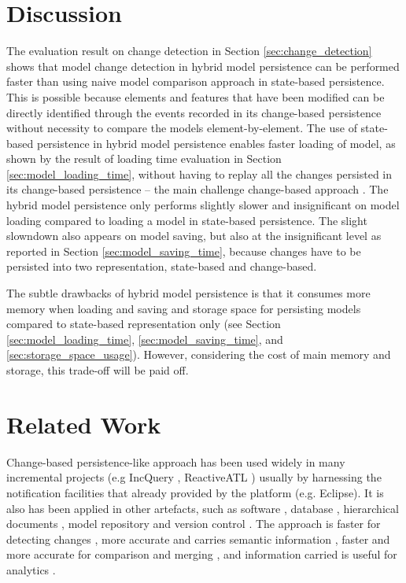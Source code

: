 \documentclass[10pt,conference]{IEEEtran}
\begin{document}
\section{Discussion}
\label{sec:discussion}
The evaluation result on change detection in Section \ref{sec:change_detection} shows that model change detection in hybrid model persistence can be performed faster than using naive model comparison approach in state-based persistence. This is possible because elements and features that have been modified can be directly identified through the events recorded in its change-based persistence without necessity to compare the models element-by-element. The use of state-based persistence in hybrid model persistence enables faster loading of model, as shown by the result of loading time evaluation in Section \ref{sec:model_loading_time}, without having to replay all the changes persisted in its change-based persistence -- the main challenge change-based approach \cite{mens2002state}. 
The hybrid model persistence only performs slightly slower and insignificant on model loading compared to loading a model in state-based persistence. The slight slowndown also appears on model saving, but also at the insignificant level as reported in Section \ref{sec:model_saving_time}, because changes have to be persisted into two representation, state-based and change-based. 

The subtle drawbacks of hybrid model persistence is that it consumes more memory when loading and saving and storage space for persisting models compared to state-based representation only (see Section \ref{sec:model_loading_time}, \ref{sec:model_saving_time}, and \ref{sec:storage_space_usage}). However, considering the cost of main memory and storage, this trade-off will be paid off.

\section{Related Work}
\label{sec:related_work}
Change-based persistence-like approach has been used widely in many incremental projects (e.g IncQuery \cite{DBLP:conf/ecmdafa/RathHV12}, ReactiveATL \cite{DBLP:conf/ecmdafa/OgunyomiRK15}) usually by harnessing the notification facilities that already provided by the platform (e.g. Eclipse). It is also has been applied in other artefacts, such as software \cite{DBLP:journals/entcs/RobbesL07}, database \cite{DBLP:conf/sde/LippeO92}, hierarchical documents \cite{DBLP:conf/caise/IgnatN05}, model repository and version control \cite{koegel2010emfstore}. The approach is faster for detecting changes \cite{DBLP:conf/edoc/KoegelHLHD10}, more accurate and carries semantic information \cite{DBLP:journals/entcs/RobbesL07,DBLP:conf/sde/LippeO92,DBLP:conf/caise/IgnatN05,mens2002state}, faster and more accurate for comparison and merging \cite{DBLP:conf/sde/LippeO92,DBLP:conf/caise/IgnatN05,koegel2010emfstore}, and information carried is useful for analytics \cite{DBLP:journals/entcs/RobbesL07}.
\end{document}
